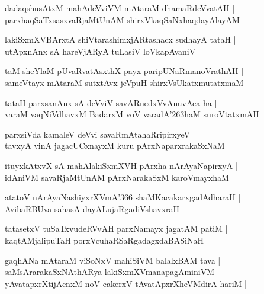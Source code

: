 \begin{shloka}
dadaqshusAtxM mahAdeVviVM mAtaraM dhamaRdeVvatAH |\\
parxhaqSaTxsasxvaRjaMtUnAM shirxVkaqSaNxhaqdayAlayAM 
\end{shloka}

\begin{shloka}
lakiSxmXVBArxtA shiVtarashimxjARtashacx sudhayA tataH |\\
utApxnAnx sA hareVjARyA tuLasiV loVkapAvaniV
\end{shloka}

\begin{shloka}
taM sheYlaM pUvaRvatAsxthX payx paripUNaRmanoVrathAH |\\
sameVtayx mAtaraM sutxtAvx jeVpuH shirxVsUkatxmutatxmaM
\end{shloka}

\begin{shloka}
tataH parxsanAnx sA deVviV savARnedxVvAnuvAca ha |\\
varaM vaqNiVdhavxM BadarxM voV varadA\char'263haM suroVtatxmAH
\end{shloka}

\begin{shloka}
parxsiVda kamaleV deVvi savaRmAtahaRripirxyeV |\\
tavxyA vinA jagacUCxnayxM kuru pArxNaparxrakaSxNaM
\end{shloka}

\begin{shloka}
ituyxkAtxvX sA mahAlakiSxmXVH pArxha nArAyaNapirxyA |\\
idAniVM savaRjaMtUnAM pArxNarakaSxM karoVmayxhaM 
\end{shloka}

\begin{shloka}
atatoV nArAyaNashiyxrXVmA\char'366 shaMKacakarxgadAdharaH |\\
AvibaRBUva sahasA dayALujaRgadiVshavxraH
\end{shloka}

\begin{shloka}
tatasetxV tuSaTxvudeRVvAH parxNamayx jagatAM patiM |\\
kaqtAMjalipuTaH porxVcuhaRSaRgadagxdaBASiNaH 
\end{shloka}

\begin{shloka}
gaqhANa mAtaraM viSoNxV mahiSiVM balalxBAM tava |
saMsArarakaSxNAthARya lakiSxmXVmanapagAminiVM\\
yAvatapxrXtijAcnxM noV cakerxV tAvatApxrXheVMdirA hariM |
\end{shloka}

